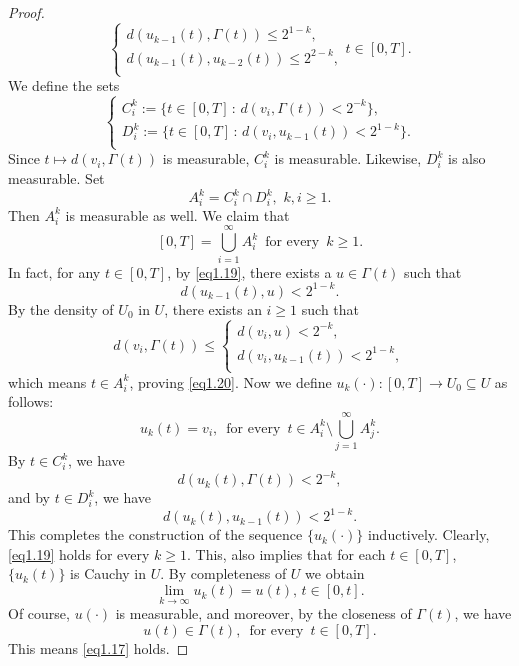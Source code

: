 \begin{proof}
        \begin{equation}\label{eq1.19}
            \left\{ 
                \begin{array}{l}
                    d(u_{k-1}(t),\Gamma(t))\leq 2^{1-k},  \\
                    d(u_{k-1}(t),u_{k-2}(t))\leq 2^{2-k},\\
                \end{array}
            \right. t\in[0,T].
        \end{equation}
        We define the sets
        $$
        \left\{ 
            \begin{array}{l}
        	    C^k_i:=\{t\in[0,T] \, : \, d(v_i,\Gamma(t))<2^{-k}\}, \\
        	    D^k_i:=\{t\in[0,T] \, : \, d(v_i,u_{k-1}(t))< 2^{1-k}\}.\\
            \end{array}
        \right.
        $$
        Since $t \mapsto d(v_i,\Gamma(t))$ is measurable, $C^k_i$ is measurable. 
        Likewise, $D^k_i$ is also measurable. Set
        $$
            A^k_i = C^k_i \cap D^k_i, \, \, k,i \geq 1.
        $$
        Then $A^k_i$ is measurable as well. We claim that
        \begin{equation}\label{eq1.20}
            [0,T]=\bigcup^{\infty}_{i=1} A^k_i \, \mbox{ for every } \, k\geq 1.
        \end{equation}
        In fact, for any $t\in[0,T]$, by \cref{eq1.19}, there exists a $u\in\Gamma(t)$ 
        such that 
        $$
            d(u_{k-1}(t),u)<2^{1-k}.
        $$
        By the density of $U_0$ in $U$, there exists an $i\geq 1$ such that
        $$
            d(v_i,\Gamma(t))\leq
            \left\{ \begin{array}{l}
        	    d(v_i,u)< 2^{-k},  \\
        	    d(v_i,u_{k-1}(t))<2^{1-k},\\
            \end{array}
            \right.
        $$
        which means $t\in A^k_i$, proving \cref{eq1.20}. Now we define
        $u_k(\cdot):[0,T]\to U_0\subseteq U$ as follows:
        $$
            u_k(t)=v_i,\,\mbox{ for every }\, t\in A^k_{i} \setminus %
            \bigcup^{\infty}_{j=1}A^k_j.
        $$
        By $t\in C^k_i$, we have 
        $$
            d(u_k(t),\Gamma(t))<2^{-k},
        $$
        and by $t\in D^k_i$, we have
        $$
            d(u_k(t),u_{k-1}(t))<2^{1-k}.
        $$
        This completes the construction of the sequence $\{u_k(\cdot)\}$ inductively.
        Clearly, \cref{eq1.19} holds for every $k\geq 1$. This, also implies that 
        for each $t\in[0,T]$, $\{u_k(t)\}$ is Cauchy in $U$. By completeness of $U$
        we obtain 
        $$
            \lim_{k\to \infty} u_k(t)=u(t),\, t\in [0,t].
        $$
        Of course, $u(\cdot)$ is measurable, and moreover, by the closeness of 
        $\Gamma(t)$, we have
        $$
            u(t)\in \Gamma(t),\,\mbox{ for every }\, t\in [0,T].
        $$
        This means \cref{eq1.17} holds.
    \end{proof}
